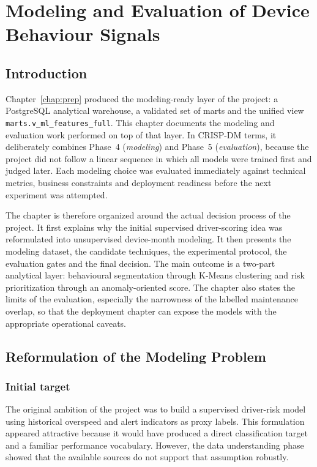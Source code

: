 \chapter{Modeling and Evaluation of Device Behaviour Signals}
\label{chap:model}

\section{Introduction}
Chapter~\ref{chap:prep} produced the modeling-ready layer of the project: a PostgreSQL analytical warehouse, a validated set of marts and the unified view \texttt{marts.v\_ml\_features\_full}. This chapter documents the modeling and evaluation work performed on top of that layer. In CRISP-DM terms, it deliberately combines Phase~4 (\emph{modeling}) and Phase~5 (\emph{evaluation}), because the project did not follow a linear sequence in which all models were trained first and judged later. Each modeling choice was evaluated immediately against technical metrics, business constraints and deployment readiness before the next experiment was attempted.

The chapter is therefore organized around the actual decision process of the project. It first explains why the initial supervised driver-scoring idea was reformulated into unsupervised device-month modeling. It then presents the modeling dataset, the candidate techniques, the experimental protocol, the evaluation gates and the final decision. The main outcome is a two-part analytical layer: behavioural segmentation through K-Means clustering and risk prioritization through an anomaly-oriented score. The chapter also states the limits of the evaluation, especially the narrowness of the labelled maintenance overlap, so that the deployment chapter can expose the models with the appropriate operational caveats.

\section{Reformulation of the Modeling Problem}

\subsection{Initial target}
The original ambition of the project was to build a supervised driver-risk model using historical overspeed and alert indicators as proxy labels. This formulation appeared attractive because it would have produced a direct classification target and a familiar performance vocabulary. However, the data understanding phase showed that the available sources do not support that assumption robustly.

